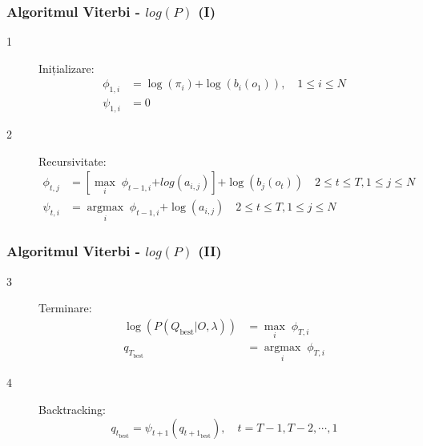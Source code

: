 \begin{frame}
  \frametitle{Algoritmul Viterbi - $log(P)$ (I)}
  \begin{description}
  \item[1] Inițializare: \\
    \begin{equation}
      \label{eq:viterbi-initialization}
      \begin{split}
        \phi_{1,i} & = \log(\pi_{i}) \mathbf{+} \log(b_i(o_1)), \quad 1 \le i \le N \\
        \psi_{1,i} & = 0
      \end{split}
    \end{equation}
  \item[2] Recursivitate: \\
    \begin{equation}
      \label{eq:viterbi-recursion}
      \begin{split}
        \phi_{t,j} & = [\underset{i}{\operatorname{max}}\; \phi_{t-1,i} \mathbf{+}
        log(a_{i,j})] \mathbf{+} \log(b_{j}(o_{t}))
        \quad \scriptstyle{2 \le t \le T, 1 \le j \le N} \\
        \psi_{t,i} & = \underset{i}{\operatorname{argmax}}\; \phi_{t-1,i} \mathbf{+}
        \log(a_{i,j}) \quad \scriptstyle{2 \le t \le T, 1 \le j \le N}
      \end{split}
    \end{equation}
  \end{description}
\end{frame}

\begin{frame}
  \frametitle{Algoritmul Viterbi - $log(P)$ (II)}
  \begin{description}
  \item[3] Terminare: \\
    \begin{equation}
      \label{eq:viterbi-termination}
      \begin{split}
        \log(P(Q_{\text{best}} \vert O, \lambda)) & = \underset{i}{\operatorname{max}}\; \phi_{T,i} \\
        q_{T_{\text{best}}} & = \underset{i}{\operatorname{argmax}}\; \phi_{T,i}
      \end{split}
    \end{equation}
  \item[4] Backtracking: \\
    \begin{equation}
      \label{eq:viterbi-backtracking}
      q_{t_{\text{best}}} = \psi_{t+1}(q_{t+1_{\text{best}}}), \quad \scriptstyle{t=T-1,T-2,\cdots, 1}
    \end{equation}
  \end{description}
\end{frame}

